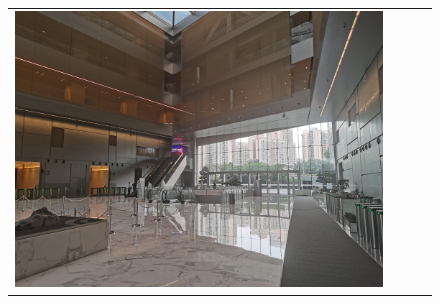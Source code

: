 \documentclass[conference]{IEEEtran}
\begin{document}
\begin{figure}
\begin{center}
\begin{tabular}{cccc}
				\includegraphics[scale=0.024]{fig/hall.jpg}
				

\end{tabular}
\end{center}
\end{figure}
\end{document}
